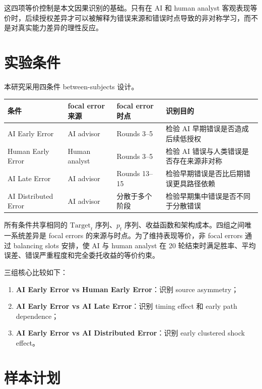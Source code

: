 \documentclass[12pt]{article}
\begin{document}
这四项等价控制是本文因果识别的基础。只有在 AI 和 human analyst 客观表现等价时，后续授权差异才可以被解释为错误来源和错误时点导致的非对称学习，而不是对真实能力差异的理性反应。

\section{实验条件}

本研究采用四条件 between-subjects 设计。

\begin{center}
\begin{tabular}{llll}
\toprule
\textbf{条件} & \textbf{focal error 来源} & \textbf{focal error 时点} & \textbf{识别目的} \\
\midrule
AI Early Error & AI advisor & Rounds 3--5 & 检验 AI 早期错误是否造成后续低授权 \\
Human Early Error & Human analyst & Rounds 3--5 & 检验 AI 错误与人类错误是否存在来源非对称 \\
AI Late Error & AI advisor & Rounds 13--15 & 检验早期错误是否比后期错误更具路径依赖 \\
AI Distributed Error & AI advisor & 分散于多个阶段 & 检验早期集中错误是否不同于分散错误 \\
\bottomrule
\end{tabular}
\end{center}

所有条件共享相同的 $\text{Target}_t$ 序列、$p_t$ 序列、收益函数和架构成本。四组之间唯一系统差异是 focal errors 的来源与时点。为了维持表现等价，非 focal errors 通过 balancing slots 安排，使 AI 与 human analyst 在 20 轮结束时满足胜率、平均误差、错误严重程度和完全委托收益的等价约束。

三组核心比较如下：
\begin{enumerate}[label=\arabic*.]
    \item \textbf{AI Early Error vs Human Early Error}：识别 source asymmetry；
    \item \textbf{AI Early Error vs AI Late Error}：识别 timing effect 和 early path dependence；
    \item \textbf{AI Early Error vs AI Distributed Error}：识别 early clustered shock effect。
\end{enumerate}

\section{样本计划}
\end{document}
